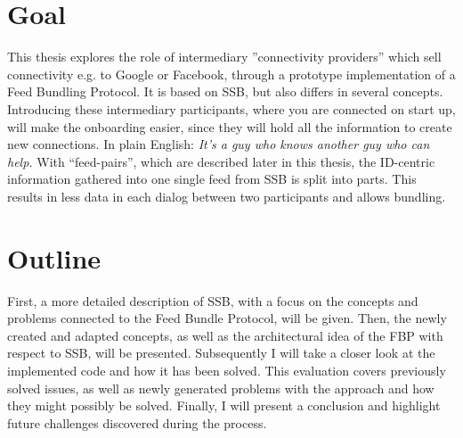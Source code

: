 \section{Goal}
This thesis explores the role of intermediary ”connectivity providers” which sell connectivity e.g. to Google or Facebook, through a prototype implementation of a Feed Bundling Protocol. It is based on SSB, but also differs in several concepts. Introducing these intermediary participants, where you are connected on start up, will make the onboarding easier, since they will hold all the information to create new connections. In plain English: \textit{It’s a guy who knows another guy who can help.} With “feed-pairs”, which are described later in this thesis, the ID-centric information gathered into one single feed from SSB is split into parts. This results in less data in each dialog between two participants and allows bundling. 

\section{Outline}
First, a more detailed description of SSB, with a focus on the concepts and problems connected to the Feed Bundle Protocol, will be given. Then, the newly created and adapted concepts, as well as the architectural idea of the FBP with respect to SSB, will be presented. Subsequently I will take a closer look at the implemented code and how it has been solved. This evaluation covers previously solved issues, as well as newly generated problems with the approach and how they might possibly be solved. Finally, I will present a conclusion and highlight future challenges discovered during the process. 

